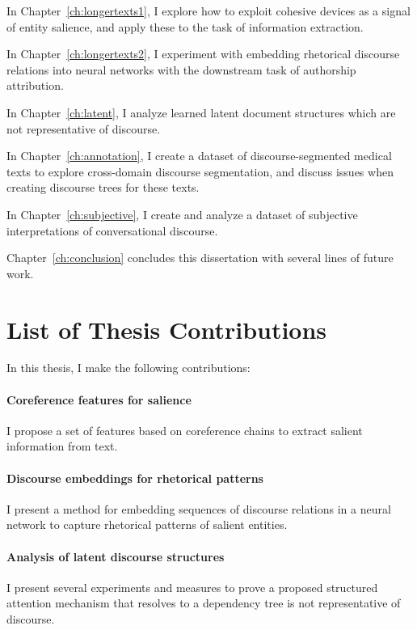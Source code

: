 In Chapter~\ref{ch:longertexts1}, I explore how to exploit cohesive devices as a signal of entity salience, and apply these to the task of information extraction.

In Chapter~\ref{ch:longertexts2}, I experiment with embedding rhetorical discourse relations into neural networks with the downstream task of authorship attribution.

In Chapter~\ref{ch:latent}, I analyze learned latent document structures which are not representative of discourse.

In Chapter~\ref{ch:annotation}, I create a dataset of discourse-segmented medical texts to explore cross-domain discourse segmentation, and discuss issues when creating discourse trees for these texts.

In Chapter~\ref{ch:subjective}, I create and analyze a dataset of subjective interpretations of conversational discourse.

Chapter~\ref{ch:conclusion} concludes this dissertation with several lines of future work.


\section{List of Thesis Contributions}

\noindent In this thesis, I make the following contributions:

\paragraph{Coreference features for salience}
I propose a set of features based on coreference chains to extract salient information from text.

\paragraph{Discourse embeddings for rhetorical patterns}
I present a method for embedding sequences of discourse relations in a neural network to capture rhetorical patterns of salient entities.

\paragraph{Analysis of latent discourse structures}
I present several experiments and measures to prove a proposed structured attention mechanism that resolves to a dependency tree is not representative of discourse.

